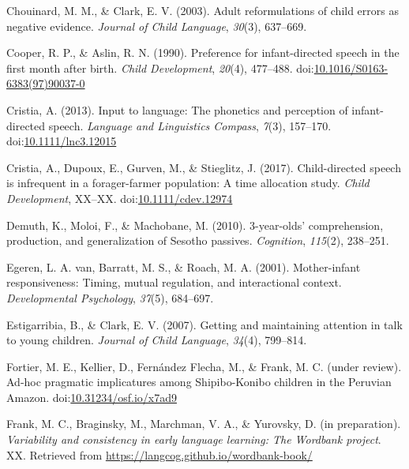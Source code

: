 \documentclass[floatsintext,man]{apa6}
\theoremstyle{definition}
\theoremstyle{definition}
\theoremstyle{definition}
\theoremstyle{remark}
\begin{document}
\hypertarget{ref-chouinard2003adult}{}
Chouinard, M. M., \& Clark, E. V. (2003). Adult reformulations of child
errors as negative evidence. \emph{Journal of Child Language},
\emph{30}(3), 637--669.

\hypertarget{ref-cooper1990preference}{}
Cooper, R. P., \& Aslin, R. N. (1990). Preference for infant-directed
speech in the first month after birth. \emph{Child Development},
\emph{20}(4), 477--488.
doi:\href{https://doi.org/10.1016/S0163-6383(97)90037-0}{10.1016/S0163-6383(97)90037-0}

\hypertarget{ref-cristia2013input}{}
Cristia, A. (2013). Input to language: The phonetics and perception of
infant-directed speech. \emph{Language and Linguistics Compass},
\emph{7}(3), 157--170.
doi:\href{https://doi.org/10.1111/lnc3.12015}{10.1111/lnc3.12015}

\hypertarget{ref-cristia2017child}{}
Cristia, A., Dupoux, E., Gurven, M., \& Stieglitz, J. (2017).
Child-directed speech is infrequent in a forager-farmer population: A
time allocation study. \emph{Child Development}, XX--XX.
doi:\href{https://doi.org/10.1111/cdev.12974}{10.1111/cdev.12974}

\hypertarget{ref-demuth2010three}{}
Demuth, K., Moloi, F., \& Machobane, M. (2010). 3-year-olds'
comprehension, production, and generalization of Sesotho passives.
\emph{Cognition}, \emph{115}(2), 238--251.

\hypertarget{ref-vanegeren2001mother}{}
Egeren, L. A. van, Barratt, M. S., \& Roach, M. A. (2001). Mother-infant
responsiveness: Timing, mutual regulation, and interactional context.
\emph{Developmental Psychology}, \emph{37}(5), 684--697.

\hypertarget{ref-estigarribia2007getting}{}
Estigarribia, B., \& Clark, E. V. (2007). Getting and maintaining
attention in talk to young children. \emph{Journal of Child Language},
\emph{34}(4), 799--814.

\hypertarget{ref-fortierURadhoc}{}
Fortier, M. E., Kellier, D., Fernández Flecha, M., \& Frank, M. C.
(under review). Ad-hoc pragmatic implicatures among Shipibo-Konibo
children in the Peruvian Amazon.
doi:\href{https://doi.org/10.31234/osf.io/x7ad9}{10.31234/osf.io/x7ad9}

\hypertarget{ref-frankIPvariability}{}
Frank, M. C., Braginsky, M., Marchman, V. A., \& Yurovsky, D. (in
preparation). \emph{Variability and consistency in early language
learning: The Wordbank project}. XX. Retrieved from
\url{https://langcog.github.io/wordbank-book/}
\end{document}
